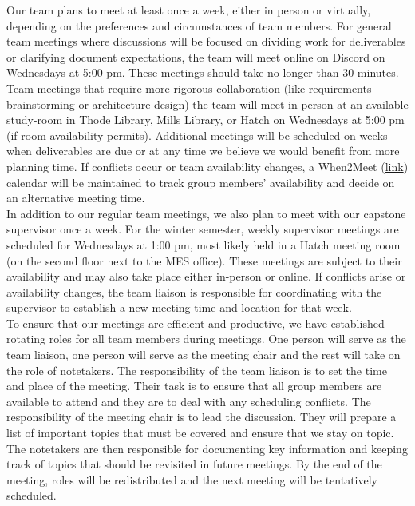 \documentclass{article}
\begin{document}
Our team plans to meet at least once a week, either in person or virtually, depending on the preferences and circumstances of team members. For general team meetings where discussions will be focused on dividing work for deliverables or clarifying document expectations, the team will meet online on Discord on Wednesdays at 5:00 pm. These meetings should take no longer than 30 minutes. Team meetings that require more rigorous collaboration (like requirements brainstorming or architecture design) the team will meet in person at an available study-room in Thode Library, Mills Library, or Hatch on Wednesdays at 5:00 pm (if room availability permits). Additional meetings will be scheduled on weeks when deliverables are due or at any time we believe we would benefit from more planning time. If conflicts occur or team availability changes, a When2Meet (\href{https://www.when2meet.com/}{link}) calendar will be maintained to track group 
members' availability and decide on an alternative meeting time.\\

In addition to our regular team meetings, we also plan to meet with our capstone supervisor once a week. For the winter semester, weekly supervisor meetings are scheduled for Wednesdays at 1:00 pm, most likely held in a Hatch meeting room (on the second floor next to the MES office). These meetings are subject to their availability and may also take place either in-person or online. If conflicts arise or availability changes, the team liaison is responsible for coordinating with the supervisor to establish a new meeting time and location for that week.\\

To ensure that our meetings are efficient and productive, we have established rotating roles for all team members during meetings. One person will serve as the team liaison, one person will serve as the meeting chair and the rest will take on the role of notetakers. The responsibility of the team liaison is to set the time and place of the meeting. Their task is to ensure that all group members are available to attend and they are to deal with any scheduling conflicts. The responsibility of the meeting chair is to lead the discussion. They will prepare a list of important topics that must be covered and ensure that we stay on topic. The notetakers are then responsible for documenting key information and keeping track of topics that should be revisited in future meetings. By the end of the meeting, roles will be redistributed and the next meeting will be tentatively scheduled.
\end{document}
